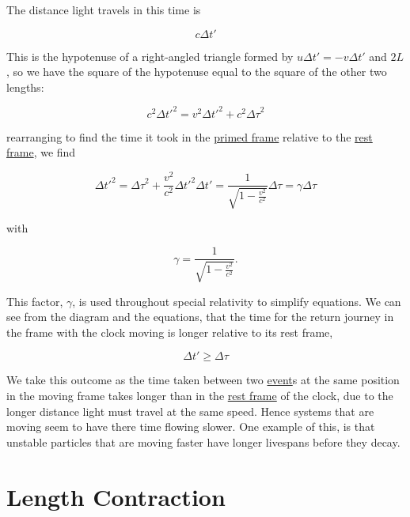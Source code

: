 The distance light travels in this time is

\begin{equation}
	{c}{\Delta t{'}}
\end{equation}

This is the hypotenuse of a right-angled triangle formed by ${u}{\Delta t{'}}=-{v}{\Delta t{'}}$ and $2{L}$, so we have the square of the hypotenuse equal to the square of the other two lengths:

\begin{equation}
	{c}^2 {\Delta t{'}}^2 = {v}^2 {\Delta t{'}}^2 + {c}^2{\Delta\tau}^2
\end{equation}

rearranging to find the time it took in the \hyperlink{def-Primed-Frame}{primed frame} relative to the \hyperlink{def-proper-frame}{rest frame}, we find

\begin{equation}
	\label{eq: time dilation}
	{\Delta t{'}}^2 = {\Delta\tau}^2 + \frac{{v}^2}{c^2} {\Delta t{'}}^2
	{\Delta t{'}} = \frac{1}{\sqrt{1-\frac{{v}^2}{{c}^2}}} {\Delta\tau} = {\gamma} {\Delta\tau}
\end{equation}

with

\begin{equation}
	{\gamma} = \frac{1}{\sqrt{1-\frac{{v}^2}{{c}^2}}}.
\end{equation}

This factor, ${\gamma}$, is used throughout special relativity to simplify equations.
We can see from the diagram and the equations, that the time for the return journey in the frame with the clock moving is longer relative to its rest frame,

\begin{equation}
	{\Delta t{'}} \geq {\Delta\tau}
\end{equation}

We take this outcome as the time taken between two \hyperlink{def-event}{event}s at the same position in the moving frame takes longer than in the \hyperlink{def-proper-frame}{rest frame} of the clock, due to the longer distance light must travel at the same speed.
Hence systems that are moving seem to have there time flowing slower.
One example of this, is that unstable particles that are moving faster have longer livespans before they decay.

\section{Length Contraction} \label{sect: Length Contraction}

